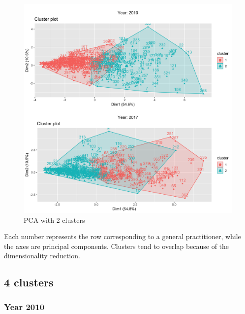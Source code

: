\begin{figure}[h]
	\centering
	\includegraphics[scale=0.18]{../k-means/clusters-2.png}
	\caption{\small PCA with 2 clusters}
\end{figure}

Each number represents the row corresponding to a general practitioner, while the axes are principal components. Clusters tend to overlap because of the dimensionality reduction.

\subsection{4 clusters}

\subsubsection{Year 2010}
\begin{center}
	\begin{table}[h]
\caption{\small $k$-means with 4 clusters, 2010}
\vspace{-30px}
\end{table}
\end{center}
\medskip

